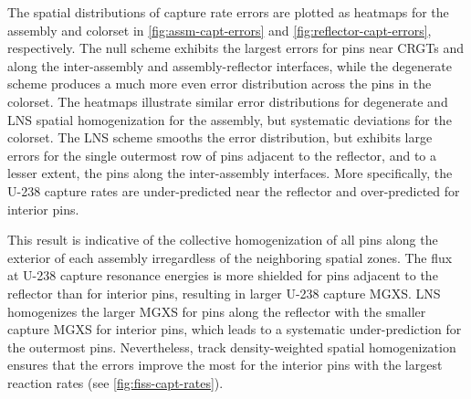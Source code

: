 The spatial distributions of capture rate errors are plotted as heatmaps for the assembly and colorset in \autoref{fig:assm-capt-errors} and \autoref{fig:reflector-capt-errors}, respectively. The null scheme exhibits the largest errors for pins near CRGTs and along the inter-assembly and assembly-reflector interfaces, while the degenerate scheme produces a much more even error distribution across the pins in the colorset. The heatmaps illustrate similar error distributions for degenerate and LNS spatial homogenization for the assembly, but systematic deviations for the colorset. The LNS scheme smooths the error distribution, but exhibits large errors for the single outermost row of pins adjacent to the reflector, and to a lesser extent, the pins along the inter-assembly interfaces. More specifically, the U-238 capture rates are under-predicted near the reflector and over-predicted for interior pins.

This result is indicative of the collective homogenization of all pins along the exterior of each assembly irregardless of the neighboring spatial zones. The flux at U-238 capture resonance energies is more shielded for pins adjacent to the reflector than for interior pins, resulting in larger U-238 capture MGXS. LNS homogenizes the larger MGXS for pins along the reflector with the smaller capture MGXS for interior pins, which leads to a systematic under-prediction for the outermost pins. Nevertheless, track density-weighted spatial homogenization ensures that the errors improve the most for the interior pins with the largest reaction rates (see \autoref{fig:fiss-capt-rates}).

\clearpage

